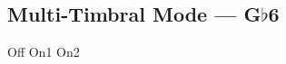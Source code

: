 \subsection{Multi-Timbral Mode --- \UiKey{\SET}G$\flat$6}









































Off
On1
On2
